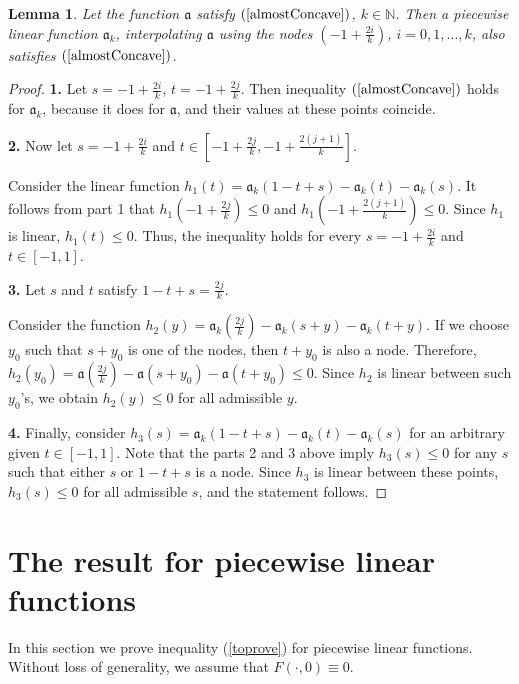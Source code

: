 \documentclass[12pt]{article}
\newcommand{\Nat}{\mathbb N}
\renewcommand{\le}{\leqslant}
\newtheorem{lm}{Lemma}
\begin{document}
\begin{lm}
\label{piecewiseLinearConcave}
Let the function $\mathfrak a$ satisfy $(\ref{almostConcave})$, $k \in \Nat$.
Then a piecewise linear function $\mathfrak a_k$,
interpolating $\mathfrak a$ using the nodes
$(-1 + \frac{2i}{k})$, $i = 0, 1, \dots, k$,
also satisfies $(\ref{almostConcave})$.
\end{lm}
\begin{proof}
{\bf 1.}
Let $s = -1 + \frac{2i}{k}$, $t = -1 + \frac{2j}{k}$.
Then inequality $(\ref{almostConcave})$ holds for $\mathfrak a_k$, because it does for $\mathfrak a$,
and their values at these points coincide.

{\bf 2.}
Now let $s = -1 + \frac{2i}{k}$ and $t \in [-1 + \frac{2j}{k}, -1 + \frac{2(j + 1)}{k}]$.

Consider the linear function $h_1(t) = \mathfrak a_k( 1 - t + s ) - \mathfrak a_k(t) - \mathfrak a_k(s)$.
It follows from part 1 that $h_1(-1 + \frac{2j}{k}) \le 0$ and $h_1(-1 + \frac{2(j + 1)}{k}) \le 0$.
Since $h_1$ is linear, $h_1(t) \le 0$.
Thus, the inequality holds for every $s = -1 + \frac{2i}{k}$ and $t \in [-1, 1]$.

{\bf 3.}
Let $s$ and $t$ satisfy $1 - t + s = \frac{2j}{k}$.

Consider the function $h_2(y) = \mathfrak a_k(\frac{2j}{k}) - \mathfrak a_k(s + y) - \mathfrak a_k(t + y)$.
If we choose $y_0$ such that $s + y_0$ is one of the nodes, then $t + y_0$ is also a node.
Therefore, $h_2(y_0) = \mathfrak a(\frac{2j}{k}) - \mathfrak a(s + y_0) - \mathfrak a(t + y_0) \le 0$.
Since $h_2$ is linear between such $y_0$'s, we obtain $h_2(y) \le 0$ for all admissible $y$.

{\bf 4.}
Finally, consider $h_3(s) = \mathfrak a_k( 1 - t + s ) - \mathfrak a_k(t) - \mathfrak a_k(s)$ for an arbitrary given $t \in [-1, 1]$.
Note that the parts 2 and 3 above imply $h_3(s) \le 0$ for any $s$
such that either $s$ or $1 - t + s$ is a node.
Since $h_3$ is linear between these points, $h_3(s) \le 0$ for all admissible $s$,
and the statement follows.
\end{proof}


\section{The result for piecewise linear functions}

\rm
In this section we prove inequality (\ref{toprove}) for piecewise linear functions.
Without loss of generality, we assume that $F(\cdot, 0) \equiv 0$.
\end{document}
